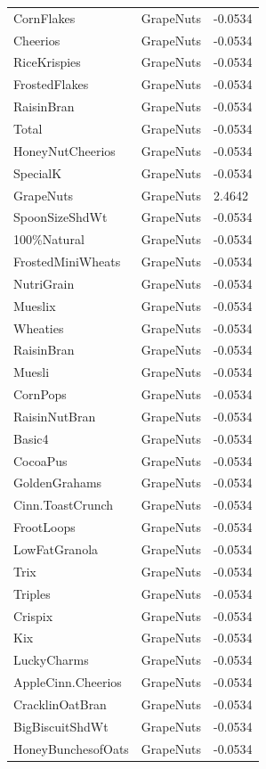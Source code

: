 \begin{table}[!htbp]
\begin{tabular}{lll}
\\
CornFlakes & GrapeNuts & -0.0534
\\
Cheerios & GrapeNuts & -0.0534
\\
RiceKrispies & GrapeNuts & -0.0534
\\
FrostedFlakes & GrapeNuts & -0.0534
\\
RaisinBran & GrapeNuts & -0.0534
\\
Total & GrapeNuts & -0.0534
\\
HoneyNutCheerios & GrapeNuts & -0.0534
\\
SpecialK & GrapeNuts & -0.0534
\\
GrapeNuts & GrapeNuts & 2.4642
\\
SpoonSizeShdWt & GrapeNuts & -0.0534
\\
100\%Natural & GrapeNuts & -0.0534
\\
FrostedMiniWheats & GrapeNuts & -0.0534
\\
NutriGrain & GrapeNuts & -0.0534
\\
Mueslix & GrapeNuts & -0.0534
\\
Wheaties & GrapeNuts & -0.0534
\\
RaisinBran & GrapeNuts & -0.0534
\\
Muesli & GrapeNuts & -0.0534
\\
CornPops & GrapeNuts & -0.0534
\\
RaisinNutBran & GrapeNuts & -0.0534
\\
Basic4 & GrapeNuts & -0.0534
\\
CocoaPus & GrapeNuts & -0.0534
\\
GoldenGrahams & GrapeNuts & -0.0534
\\
Cinn.ToastCrunch & GrapeNuts & -0.0534
\\
FrootLoops & GrapeNuts & -0.0534
\\
LowFatGranola & GrapeNuts & -0.0534
\\
Trix & GrapeNuts & -0.0534
\\
Triples & GrapeNuts & -0.0534
\\
Crispix & GrapeNuts & -0.0534
\\
Kix & GrapeNuts & -0.0534
\\
LuckyCharms & GrapeNuts & -0.0534
\\
AppleCinn.Cheerios & GrapeNuts & -0.0534
\\
CracklinOatBran & GrapeNuts & -0.0534
\\
BigBiscuitShdWt & GrapeNuts & -0.0534
\\
HoneyBunchesofOats & GrapeNuts & -0.0534

\end{tabular}
\end{table}
